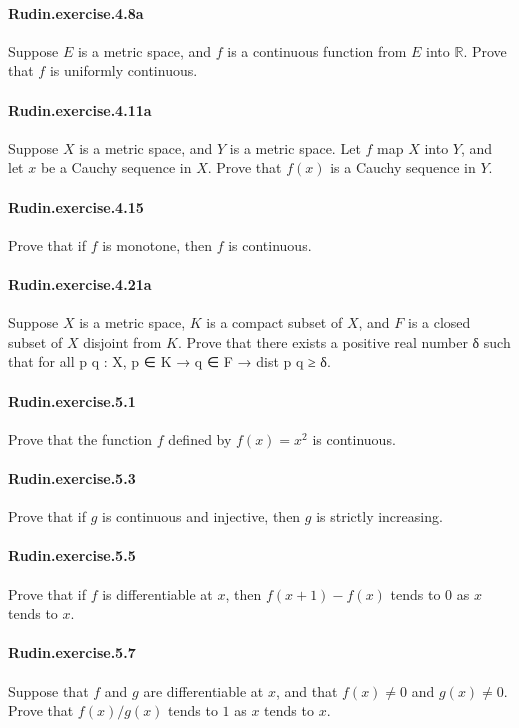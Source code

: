 \documentclass{article}
\begin{document}
{\paragraph{Rudin.exercise.4.8a} Suppose $E$ is a metric space, and $f$ is a continuous function from $E$ into $\mathbb{R}$. Prove that $f$ is uniformly continuous.

\paragraph{Rudin.exercise.4.11a} Suppose $X$ is a metric space, and $Y$ is a metric space. Let $f$ map $X$ into $Y$, and let $x$ be a Cauchy sequence in $X$. Prove that $f(x)$ is a Cauchy sequence in $Y$.

\paragraph{Rudin.exercise.4.15} Prove that if $f$ is monotone, then $f$ is continuous.

\paragraph{Rudin.exercise.4.21a} Suppose $X$ is a metric space, $K$ is a compact subset of $X$, and $F$ is a closed subset of $X$ disjoint from $K$. Prove that there exists a positive real number δ such that for all p q : X, p ∈ K → q ∈ F → dist p q ≥ δ.

\paragraph{Rudin.exercise.5.1} Prove that the function $f$ defined by $f(x) = x^2$ is continuous.

\paragraph{Rudin.exercise.5.3} Prove that if $g$ is continuous and injective, then $g$ is strictly increasing.

\paragraph{Rudin.exercise.5.5} Prove that if $f$ is differentiable at $x$, then $f(x+1)-f(x)$ tends to $0$ as $x$ tends to $x$.

\paragraph{Rudin.exercise.5.7} Suppose that $f$ and $g$ are differentiable at $x$, and that $f(x) \neq 0$ and $g(x) \neq 0$. Prove that $f(x) / g(x)$ tends to $1$ as $x$ tends to $x$.

}
\end{document}
